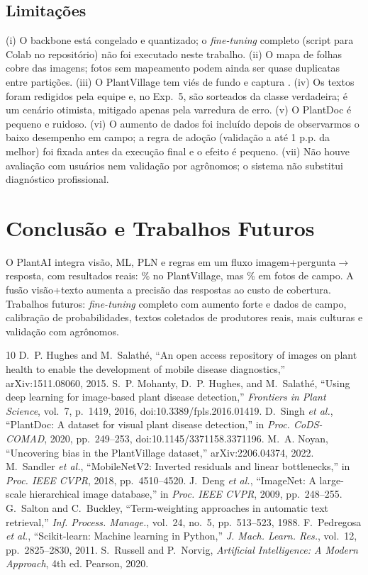 \documentclass[conference]{IEEEtran}
\begin{document}
\subsection{Limitações}
(i) O backbone está congelado e quantizado; o \textit{fine-tuning} completo (script para Colab no repositório) não foi executado neste trabalho. (ii) O mapa de folhas cobre \nGrouped{} das \nUnique{} imagens; fotos sem mapeamento podem ainda ser quase duplicatas entre partições. (iii) O PlantVillage tem viés de fundo e captura \cite{noyan2022}. (iv) Os textos foram redigidos pela equipe e, no Exp.~5, são sorteados da classe verdadeira; é um cenário otimista, mitigado apenas pela varredura de erro. (v) O PlantDoc é pequeno e ruidoso. (vi) O aumento de dados foi incluído depois de observarmos o baixo desempenho em campo; a regra de adoção (validação a até 1 p.p. da melhor) foi fixada antes da execução final e o efeito é pequeno. (vii) Não houve avaliação com usuários nem validação por agrônomos; o sistema não substitui diagnóstico profissional.

\section{Conclusão e Trabalhos Futuros}
O PlantAI integra visão, ML, PLN e regras em um fluxo imagem+pergunta$\to$resposta, com resultados reais: \accMobile\% no PlantVillage, mas \pdAcc\% em fotos de campo. A fusão visão+texto aumenta a precisão das respostas ao custo de cobertura. Trabalhos futuros: \textit{fine-tuning} completo com aumento forte e dados de campo, calibração de probabilidades, textos coletados de produtores reais, mais culturas e validação com agrônomos.

\begin{thebibliography}{10}
 D.~P. Hughes and M.~Salath\'e, ``An open access repository of images on plant health to enable the development of mobile disease diagnostics,'' arXiv:1511.08060, 2015.
 S.~P. Mohanty, D.~P. Hughes, and M.~Salath\'e, ``Using deep learning for image-based plant disease detection,'' \textit{Frontiers in Plant Science}, vol.~7, p.~1419, 2016, doi:10.3389/fpls.2016.01419.
 D.~Singh \textit{et al.}, ``PlantDoc: A dataset for visual plant disease detection,'' in \textit{Proc. CoDS-COMAD}, 2020, pp.~249--253, doi:10.1145/3371158.3371196.
 M.~A. Noyan, ``Uncovering bias in the PlantVillage dataset,'' arXiv:2206.04374, 2022.
 M.~Sandler \textit{et al.}, ``MobileNetV2: Inverted residuals and linear bottlenecks,'' in \textit{Proc. IEEE CVPR}, 2018, pp.~4510--4520.
 J.~Deng \textit{et al.}, ``ImageNet: A large-scale hierarchical image database,'' in \textit{Proc. IEEE CVPR}, 2009, pp.~248--255.
 G.~Salton and C.~Buckley, ``Term-weighting approaches in automatic text retrieval,'' \textit{Inf. Process. Manage.}, vol.~24, no.~5, pp.~513--523, 1988.
 F.~Pedregosa \textit{et al.}, ``Scikit-learn: Machine learning in Python,'' \textit{J. Mach. Learn. Res.}, vol.~12, pp.~2825--2830, 2011.
 S.~Russell and P.~Norvig, \textit{Artificial Intelligence: A Modern Approach}, 4th ed. Pearson, 2020.
\end{thebibliography}
\end{document}
